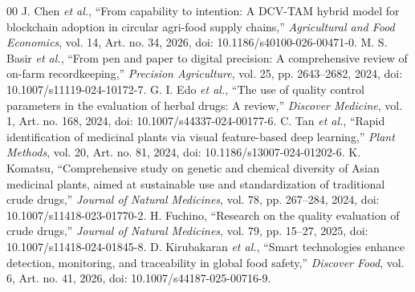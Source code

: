 \documentclass[conference]{IEEEtran}
\begin{document}
\begin{thebibliography}{00}
 J. Chen \emph{et al.}, ``From capability to intention: A DCV-TAM hybrid model for blockchain adoption in circular agri-food supply chains,'' \emph{Agricultural and Food Economics}, vol. 14, Art. no. 34, 2026, doi: 10.1186/s40100-026-00471-0.
 M. S. Basir \emph{et al.}, ``From pen and paper to digital precision: A comprehensive review of on-farm recordkeeping,'' \emph{Precision Agriculture}, vol. 25, pp. 2643--2682, 2024, doi: 10.1007/s11119-024-10172-7.
 G. I. Edo \emph{et al.}, ``The use of quality control parameters in the evaluation of herbal drugs: A review,'' \emph{Discover Medicine}, vol. 1, Art. no. 168, 2024, doi: 10.1007/s44337-024-00177-6.
 C. Tan \emph{et al.}, ``Rapid identification of medicinal plants via visual feature-based deep learning,'' \emph{Plant Methods}, vol. 20, Art. no. 81, 2024, doi: 10.1186/s13007-024-01202-6.
 K. Komatsu, ``Comprehensive study on genetic and chemical diversity of Asian medicinal plants, aimed at sustainable use and standardization of traditional crude drugs,'' \emph{Journal of Natural Medicines}, vol. 78, pp. 267--284, 2024, doi: 10.1007/s11418-023-01770-2.
 H. Fuchino, ``Research on the quality evaluation of crude drugs,'' \emph{Journal of Natural Medicines}, vol. 79, pp. 15--27, 2025, doi: 10.1007/s11418-024-01845-8.
 D. Kirubakaran \emph{et al.}, ``Smart technologies enhance detection, monitoring, and traceability in global food safety,'' \emph{Discover Food}, vol. 6, Art. no. 41, 2026, doi: 10.1007/s44187-025-00716-9.
\end{thebibliography}
\end{document}
